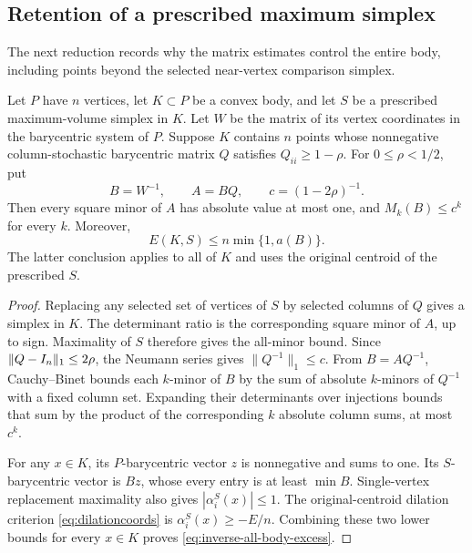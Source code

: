 \subsection{Retention of a prescribed maximum simplex}

The next reduction records why the matrix estimates control the
entire body, including points beyond the selected near-vertex
comparison simplex.

\begin{lemma}
\label{lem:inverse-geometric-reduction}
Let $P$ have $n$ vertices, let $K\subset P$ be a convex body, and
let $S$ be a prescribed maximum-volume simplex in $K$.  Let $W$ be
the matrix of its vertex coordinates in the barycentric system of
$P$.  Suppose $K$ contains $n$ points whose nonnegative
column-stochastic barycentric matrix $Q$ satisfies
$Q_{ii}\geq1-\rho$.  For $0\leq\rho<1/2$, put
\[
 B=W^{-1},\qquad A=BQ,\qquad c=(1-2\rho)^{-1}.
\]
Then every square minor of $A$ has absolute value at most one,
and $M_k(B)\leq c^k$ for every $k$.  Moreover,
\begin{equation}
 E(K,S)\leq n\min\{1,a(B)\}.
 \label{eq:inverse-all-body-excess}
\end{equation}
The latter conclusion applies to all of $K$ and uses the original
centroid of the prescribed $S$.
\end{lemma}

\begin{proof}
Replacing any selected set of vertices of $S$ by selected columns
of $Q$ gives a simplex in $K$.  The determinant ratio is the
corresponding square minor of $A$, up to sign.  Maximality of $S$
therefore gives the all-minor bound.  Since
$\|Q-I_n\|_1\leq2\rho$, the Neumann series gives
$\|Q^{-1}\|_1\leq c$.  From $B=AQ^{-1}$, Cauchy--Binet bounds
each $k$-minor of $B$ by the sum of absolute $k$-minors of
$Q^{-1}$ with a fixed column set.  Expanding their determinants
over injections bounds that sum by the product of the corresponding
$k$ absolute column sums, at most $c^k$.

For any $x\in K$, its $P$-barycentric vector $z$ is nonnegative and
sums to one.  Its $S$-barycentric vector is $Bz$, whose every entry
is at least $\min B$.  Single-vertex replacement maximality also
gives $|\alpha_i^S(x)|\leq1$.  The original-centroid dilation
criterion \eqref{eq:dilationcoords} is
$\alpha_i^S(x)\geq-E/n$.  Combining these two lower bounds for
every $x\in K$ proves \eqref{eq:inverse-all-body-excess}.
\end{proof}

